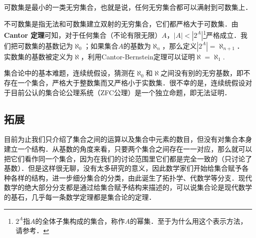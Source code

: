可数集是最小的一类无穷集合，也就是说，任何无穷集合都可以满射到可数集上．

不可数集是指无法和可数集建立双射的无穷集合，它们都严格大于可数集．由 \textbf{Cantor 定理}可知，对于任何集合（不论有限无限）$A$，$|A|<|2^A|$\footnote{$2^A$指$A$的全体子集构成的集合，称作$A$的幂集．至于为什么用这个表示方法，请参考．}严格成立．我们把可数集的基数记为$\aleph_0$；如果集合$A$的基数为$\aleph_n$，那么定义$|2^A|=\aleph_{n+1}$． 实数集的基数被定义为$\aleph$，利用Cantor-Bernstein定理可以证明$\aleph=\aleph_1$. 

集合论中的基本难题，连续统假设，猜测在$\aleph_0$和$\aleph$之间没有别的无穷基数，即不存在一个集合，严格大于整数集而又严格小于实数集．很不幸的是，连续统假设对于目前公认的集合论公理系统（ZFC公理）是一个独立命题，即无法证明．

\subsection{拓展}
目前为止我们只介绍了集合之间的运算以及集合中元素的数目，但没有对集合本身建立一个结构．从基数的角度来看，只要两个集合之间存在一一对应，那么就可以把它们看作同一个集合，因为在我们的讨论范围里它们都是完全一致的（只讨论了基数）．但是这样很无聊，没有太多研究的意义，因此数学家们开始给集合赋予各种各样的结构，进一步细分集合的分类，由此诞生了拓扑学、代数学等分支．现代数学的绝大部分分支都是通过给集合赋予结构来描述的，可以说集合论是现代数学的基石，几乎每一条数学定理都是集合论的定理．
